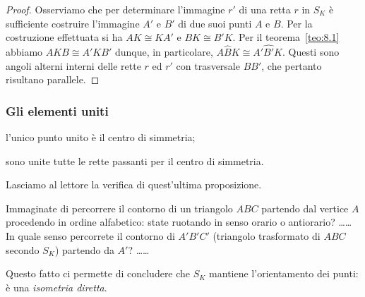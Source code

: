 \noindent\begin{minipage}{0.65\textwidth}\parindent15pt
\begin{proof}
Osserviamo che per determinare l'immagine $r'$ di una retta $r$ in 
$S_K$ è sufficiente costruire l'immagine $A'$ e $B'$ di due suoi 
punti $A$ e $B$. Per la costruzione effettuata si ha $AK\cong KA'$ e 
$BK\cong B'K$. Per il teorema~\ref{teo:8.1} abbiamo $AKB\cong A'KB'$ 
dunque, in particolare, $A\widehat{B}K\cong A'\widehat{B'}K$. Questi 
sono angoli alterni interni delle rette $r$ ed $r'$ con trasversale 
$BB'$, che pertanto risultano parallele.
\end{proof}
\end{minipage}\hfil
\begin{minipage}{0.35\textwidth}
	
\centering
\end{minipage}\vspace{8pt}

\subsubsection{Gli elementi uniti}
\begin{itemize*}
\item l'unico punto unito è il centro di simmetria;
\item sono unite tutte le rette passanti per il centro di simmetria.
\end{itemize*}
Lasciamo al lettore la verifica di quest'ultima 
proposizione.\vspace{8pt}

Immaginate di percorrere il contorno di un triangolo $ABC$ partendo 
dal vertice $A$ procedendo in ordine alfabetico: state ruotando in 
senso orario o antiorario? \ldots\ldots{} In quale senso percorrete 
il contorno di $A'B'C'$ (triangolo trasformato di $ABC$ secondo 
$S_K$) partendo da $A'$? \ldots\ldots{}

Questo fatto ci permette di concludere che $S_K$ mantiene 
l'orientamento dei punti: è una \emph{isometria diretta}.

